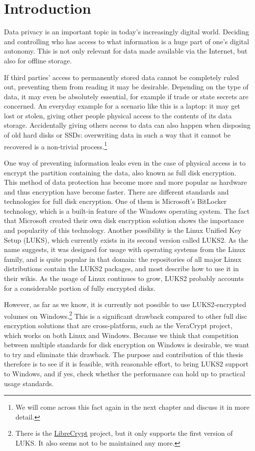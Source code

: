 \chapter{Introduction}
\label{chap:introduction}
Data privacy is an important topic in today's increasingly digital world. Deciding and controlling who has access to what information is a huge part of one's digital autonomy. This is not only relevant for data made available via the Internet, but also for offline storage.

If third parties' access to permanently stored data cannot be completely ruled out, preventing them from reading it may be desirable. Depending on the type of data, it may even be absolutely essential, for example if trade or state secrets are concerned. An everyday example for a scenario like this is a laptop: it may get lost or stolen, giving other people physical access to the contents of its data storage. Accidentally giving others access to data can also happen when disposing of old hard disks or SSDs: overwriting data in such a way that it cannot be recovered is a non-trivial process.\footnote{\label{fn:introduction.secureerasure} We will come across this fact again in the next chapter and discuss it in more detail.}

One way of preventing information leaks even in the case of physical access is to encrypt the partition containing the data, also known as full disk encryption. This method of data protection has become more and more popular as hardware and thus encryption have become faster. There are different standards and technologies for full disk encryption. One of them is Microsoft's BitLocker technology, which is a built-in feature of the Windows operating system. The fact that Microsoft created their own disk encryption solution shows the importance and popularity of this technology. Another possibility is the Linux Unified Key Setup (LUKS), which currently exists in its second version called LUKS2. As the name suggests, it was designed for usage with operating systems from the Linux family, and is quite popular in that domain: the repositories of all major Linux distributions contain the LUKS2 packages, and most describe how to use it in their wikis. As the usage of Linux continues to grow, LUKS2 probably accounts for a considerable portion of fully encrypted disks.

However, as far as we know, it is currently not possible to use LUKS2-encrypted volumes on Windows.\footnote{\label{fn:introduction.librecrypt} There is the \href{https://t-d-k.github.io/LibreCrypt/}{LibreCrypt} project, but it only supports the first version of LUKS. It also seems not to be maintained any more.} This is a significant drawback compared to other full disc encryption solutions that are cross-platform, such as the VeraCrypt project, which works on both Linux and Windows. Because we think that competition between multiple standards for disk encryption on Windows is desirable, we want to try and eliminate this drawback. The purpose and contribution of this thesis therefore is to see if it is feasible, with reasonable effort, to bring LUKS2 support to Windows, and if yes, check whether the performance can hold up to practical usage standards.

